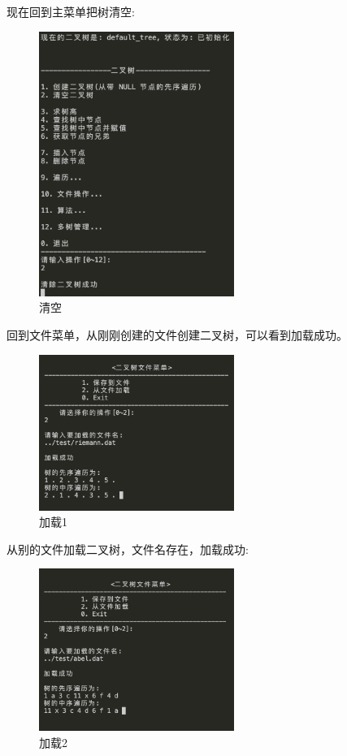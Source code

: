 \documentclass[supercite]{Experimental_Report}
\theoremstyle{definition}
\begin{document}
\noindent
现在回到主菜单把树清空:
\begin{figure}[htbp]
	\centering
	\includegraphics[width=2.5in]{binary_tree/file/save1_2.png}
	\caption{清空}
	\label{fig5-64}
\end{figure}

\noindent
回到文件菜单，从刚刚创建的文件创建二叉树，可以看到加载成功。
\begin{figure}[H]
	\centering
	\includegraphics[width=2.5in]{binary_tree/file/load1_3.png}
	\caption{加载1}
	\label{fig5-65}
\end{figure}

\clearpage
\noindent
从别的文件加载二叉树，文件名存在，加载成功:
\begin{figure}[H]
	\centering
	\includegraphics[width=2.5in]{binary_tree/file/load1_4.png}
	\caption{加载2}
	\label{fig5-66}
\end{figure}
\end{document}

